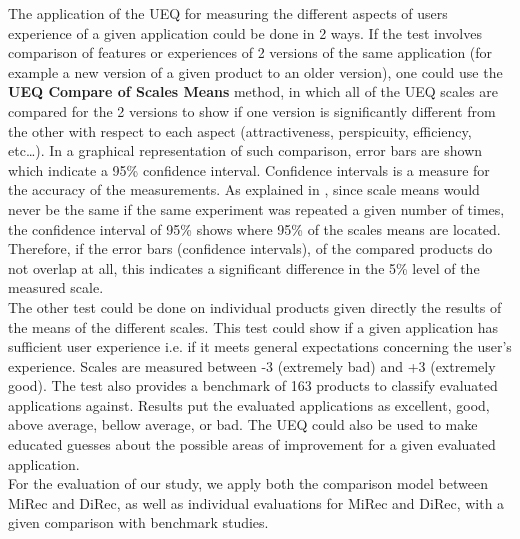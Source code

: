 The application of the UEQ for measuring the different aspects of users
experience of a given application could be done in 2 ways. If the test involves
comparison of features or experiences of 2 versions of the same application
(for example a new version of a given product to an older version), one could
use the \textbf{UEQ Compare of Scales Means} method, in which all of the UEQ
scales are compared for the 2 versions to show if one version is significantly different
from the other with respect to each aspect (attractiveness, perspicuity,
efficiency, etc\ldots). In a graphical representation of such comparison,
error bars are shown which indicate a 95\% confidence interval. Confidence
intervals is a measure for the accuracy of the measurements. As explained in
\cite{UEQHandbook}, since scale means would never be the same if the same
experiment was repeated a given number of times, the confidence interval of 95\%
shows where 95\% of the scales means are located. Therefore, if the error bars
(confidence intervals), of the compared products do not overlap at all, this
indicates a significant difference in the 5\% level of the measured scale.\\
The other test could be done on individual products given directly the results
of the means of the different scales. This test could show if a given
application has sufficient user experience i.e. if it meets general
expectations concerning the user's experience. Scales are measured between -3
(extremely bad) and +3 (extremely good). The test also provides a benchmark of
163 products to classify evaluated applications against. Results put the
evaluated applications as excellent, good, above average, bellow average,
or bad. The UEQ could also be used to make educated guesses about the possible
areas of improvement for a given evaluated application.\\
For the evaluation of our study, we apply both the comparison model between
MiRec and DiRec, as well as individual evaluations for MiRec and DiRec, with a
given comparison with benchmark studies.
